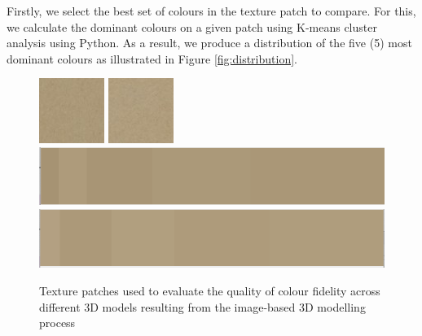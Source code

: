 \documentclass[acmlarge,screen,dvipsnames]{acmart}
\begin{document}
Firstly, we  select the best set of
colours in the texture patch to compare. For this, we calculate the
dominant colours on a given patch using K-means cluster analysis using Python. As a result, we produce a distribution of the five (5) most dominant
colours as illustrated in Figure \ref{fig:distribution}. 


\begin{figure}[h] \centering
{}
  {\includegraphics[width=0.45\linewidth]{images/m1tex_80x80.png}
   \includegraphics[width=0.45\linewidth]{images/m2tex_80x80.png}
  }\\[-0.5\baselineskip]
  {\includegraphics[width=0.45\linewidth]{images/domtex1.png}
   \includegraphics[width=0.45\linewidth]{images/domtex2.png}
  }\\[-0.5\baselineskip]

 \caption{Texture patches used to evaluate the quality of colour fidelity across different 3D models resulting from the image-based 3D modelling process} 
 \label{fig:texturepatches} 
\end{figure} 
\end{document}
